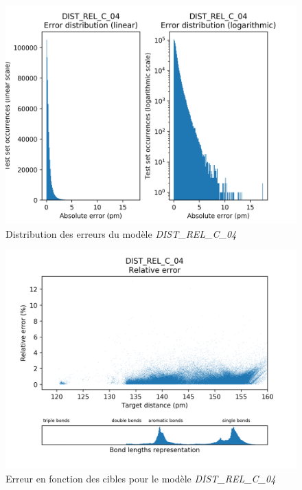 \begin{figure}[!h]
	\centering
	
	\includegraphics[scale=0.8]{../figures/DIST_REL_C_04/DIST_REL_C_04_distrib_rmse_val.png}	
	
	\caption{Distribution des erreurs du modèle \emph{DIST\_REL\_C\_04}}
\end{figure}
\begin{figure}[!h]
	\centering
	
	\includegraphics[scale=0.8]{../figures/DIST_REL_C_04/DIST_REL_C_04_distrib_rmse_dist.png}	
	
	\caption{Erreur en fonction des cibles pour le modèle \emph{DIST\_REL\_C\_04}}
	\end{figure}

